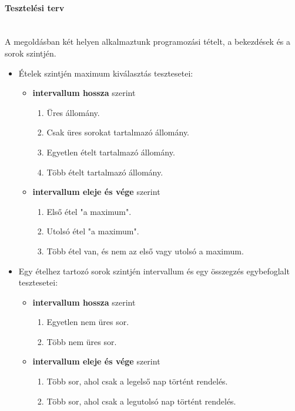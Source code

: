 \documentclass[12pt]{report}
\begin{document}
\paragraph{Tesztelési terv} \hspace{0pt} \\
A megoldásban két helyen alkalmaztunk programozási tételt, a bekezdések és a sorok szintjén. \newline
\begin{itemize}[noitemsep]
\item Ételek szintjén maximum kiválasztás tesztesetei:
\begin{itemize}[noitemsep]
\item \textbf{intervallum hossza} szerint
\begin{enumerate}[noitemsep]
\item Üres állomány.
\item Csak üres sorokat tartalmazó állomány.
\item Egyetlen ételt tartalmazó állomány.
\item Több ételt tartalmazó állomány.
\end{enumerate}
\end{itemize}
\begin{itemize}[noitemsep]
\item \textbf{intervallum eleje és vége} szerint
\begin{enumerate}[noitemsep]
\item Első étel "a maximum".
\item Utolsó étel "a maximum".
\item Több étel van, és nem az első vagy utolsó a maximum.
\end{enumerate}
\end{itemize}
\end{itemize}
\begin{itemize}[noitemsep]
\item Egy ételhez tartozó sorok szintjén intervallum és egy összegzés egybefoglalt tesztesetei:
\begin{itemize}[noitemsep]
\item \textbf{intervallum hossza} szerint
\begin{enumerate}[noitemsep]
\item Egyetlen nem üres sor.
\item Több nem üres sor.
\end{enumerate}
\end{itemize}
\begin{itemize}[noitemsep]
\item \textbf{intervallum eleje és vége} szerint
\begin{enumerate}[noitemsep]
\item Több sor, ahol csak a legelső nap történt rendelés.
\item Több sor, ahol csak a legutolsó nap történt rendelés.
\end{enumerate}
\end{itemize}
\end{itemize}
\end{document}
